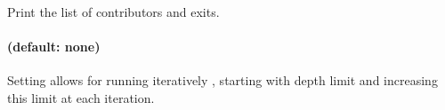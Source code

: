 %


\paragraph{}
Print the list of contributors and exits.


%

\paragraph{ (default: none)}
Setting  allows for running iteratively ,
starting with depth limit  and increasing this limit
at each iteration.

